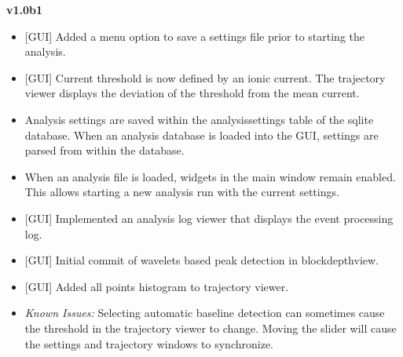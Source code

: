 \documentclass[letterpaper,10pt,english]{sphinxmanual}
\begin{document}
\textbf{v1.0b1}
\begin{itemize}
\item {} 
{[}GUI{]} Added a menu option to save a settings file prior to starting the analysis.

\item {} 
{[}GUI{]} Current threshold is now defined by an ionic current. The trajectory viewer displays the deviation of the threshold from the mean current.

\item {} 
Analysis settings are saved within the analysissettings table of the sqlite database. When an analysis database is loaded into the GUI, settings are parsed from within the database.

\item {} 
When an analysis file is loaded, widgets in the main window remain enabled. This allows starting a new analysis run with the current settings.

\item {} 
{[}GUI{]} Implemented an analysis log viewer that displays the event processing log.

\item {} 
{[}GUI{]} Initial commit of wavelets based peak detection in blockdepthview.

\item {} 
{[}GUI{]} Added all points histogram to trajectory viewer.

\item {} 
\emph{Known Issues:} Selecting automatic baseline detection can sometimes cause the threshold in the trajectory viewer to change. Moving the slider will cause the settings and trajectory windows to synchronize.

\end{itemize}



\begin{thebibliography}{BEC+14}
\end{thebibliography}
\end{document}
